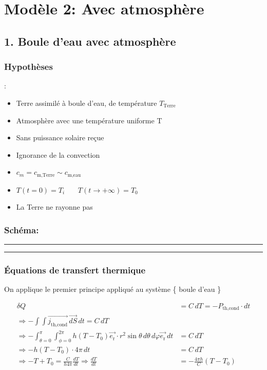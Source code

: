 \documentclass[a4paper,12pt]{article}
\begin{document}
\section*{Modèle 2: Avec atmosphère}
\subsection*{1. Boule d'eau avec atmosphère }
\subsubsection*{Hypothèses}:
\begin{itemize}
    \item Terre assimilé à boule d'eau, de température \(T_{\text{Terre}}\) 
    \item  Atmosphère avec une température uniforme T 
    \item  Sans puissance solaire reçue  
    \item  Ignorance de la convection  
    \item \(c_m=c_{\text{m,Terre}}\sim c_{\text{m,eau}}\) 
    \item $T(t=0) = T_i$ \ \ \
$T(t \to +\infty) = T_0$
    \item La Terre ne rayonne pas
   
\end{itemize}

\subsubsection*{Schéma:} 
\noindent\textcolor{gray}{\rule{\linewidth}{0.4pt}}

    
\begin{center}
  
\end{center}
\noindent\textcolor{gray}{\rule{\linewidth}{0.4pt}}

\subsubsection*{Équations de transfert thermique}

On applique le premier principe appliqué au système \{ boule d'eau  \}

\begin{align*}
\delta Q &= C\, dT = -P_{\text{th,cond}} \cdot dt \\
\Rightarrow -\int \int \vec{j_{\text{th,cond}}}\, \vec{dS}\,dt = C\, dT \\
\Rightarrow -\int_{\theta=0}^\pi \int_{\phi=0}^{2\pi} h(T - T_0) \vec{e_{\text{r}}}\cdot r^2 \sin\theta\, d\theta\, d\varphi \vec{e_{\text{r}}}\, dt &=  C\, dT  \\
\Rightarrow -h(T - T_0) \cdot 4\pi\, dt &= C\, dT \\
\Rightarrow -T + T_0 = \frac{C}{h 4\pi} \frac{dT}{dt} \Rightarrow \frac{dT}{dt} &= -\frac{4\pi h}{C}(T - T_0)
\end{align*}
\end{document}
